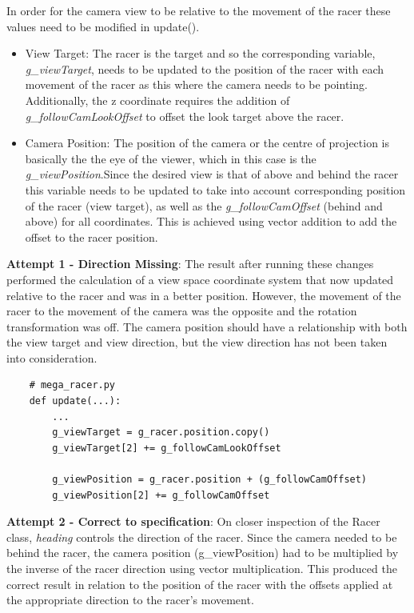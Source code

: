 \documentclass[a4 paper, 12pt]{article}
\begin{document}
In order for the camera view to be relative to the movement of the racer these values need to be modified in update().
    \begin{itemize}
        \item View Target: The racer is the target and so the corresponding variable, \textit{{}g\_viewTarget}, needs to be updated to the position of the racer with each movement of the racer as this where the camera needs to be pointing. Additionally, the z coordinate requires the addition of \textit{g\_followCamLookOffset} to offset the look target above the racer. 
        \item Camera Position: The position of the camera or the centre of projection is basically the the eye of the viewer, which in this case is the \textit{g\_viewPosition}.Since the desired view is that of above and behind the racer this variable needs to be updated to take into account corresponding position of the racer (view target), as well as the \textit{g\_followCamOffset} (behind and above) for all coordinates. This is achieved using vector addition to add the offset to the racer position.
    \end{itemize} 

\textbf{Attempt 1 - Direction Missing}: The result after running these changes performed the calculation of a view space coordinate system that now updated relative to the racer and was in a better position. However, the movement of the racer to the movement of the camera was the opposite and the rotation transformation was off. The camera position should have a relationship with both the view target and view direction, but the view direction has not been taken into consideration. 
    \begin{lstlisting}
    # mega_racer.py
    def update(...):
        ...
        g_viewTarget = g_racer.position.copy()
        g_viewTarget[2] += g_followCamLookOffset

        g_viewPosition = g_racer.position + (g_followCamOffset)
        g_viewPosition[2] += g_followCamOffset
    \end{lstlisting}

\textbf{Attempt 2 - Correct to specification}:
On closer inspection of the Racer class, \textit{heading} controls the direction of the racer. Since the camera needed to be behind the racer, the camera position (g\_viewPosition) had to be multiplied by the inverse of the racer direction using vector multiplication. This produced the correct result in relation to the position of the racer with the offsets applied at the appropriate direction to the racer's movement.
\end{document}
